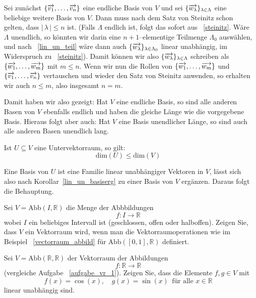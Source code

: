 \beweisvon{~\ref{vektorraum_basis_lange}} Sei zunächst 
$\{ \overrightarrow{v_1}, \ldots , \overrightarrow{v_n} \}$ eine endliche Basis von $V$ und sei 
$\{ \overrightarrow{w_{\lambda}} \}_{\lambda \in \Lambda}$ eine beliebige weitere Basis von  
$V$. Dann muss nach dem Satz von Steinitz schon gelten, dass $\vert \, \lambda \, \vert \leq n$ ist. (Falls 
$\Lambda$ endlich ist, folgt das sofort aus ~\ref{steinitz}. Wäre $\Lambda$ unendlich, so könnten wir darin 
eine $n+1$--elementige Teilmenge $\Lambda_0$ auswählen, und nach ~\ref{lin_un_teil} wäre dann auch 
$\{ \overrightarrow{w_{\lambda}} \}_{\lambda \in \Lambda_0}$ linear unabhängig, im Widerspruch zu 
~\ref{steinitz}). Damit können wir also $\{ \overrightarrow{w_{\lambda}} \}_{\lambda \in \Lambda}$ schreiben 
als $\{ \overrightarrow{w_1}, \ldots , \overrightarrow{w_m} \}$ mit $m \leq n$. Wenn wir nun die Rollen von
$\{ \overrightarrow{w_1}, \ldots , \overrightarrow{w_m} \}$ und 
$\{ \overrightarrow{v_1}, \ldots , \overrightarrow{v_n} \}$ vertauschen und wieder den Satz von Steinitz 
anwenden, so erhalten wir auch $n \leq m$, also insgesamt $n = m$.

Damit haben wir also gezeigt: Hat $V$ eine endliche Basis, so sind alle anderen Basen von $V$ ebenfalls endlich 
und haben die gleiche Länge wie die vorgegebene Basis. Hieraus folgt aber auch: Hat $V$ eine Basis unendlicher 
Länge, so sind auch alle anderen Basen unendlich lang.

\bigbreak

\begin{korollar} Ist $U \subseteq V$ eine Untervektorraum, so gilt:
  	$$ \textrm{dim}(U) \leq \textrm{dim}(V) $$
\end{korollar}

\beweis Eine Basis von $U$ ist eine Familie linear unabhängiger Vektoren in $V$, lässt sich also nach 
Korollar~\ref{lin_un_basiserg} zu einer Basis von $V$ ergänzen. Daraus folgt die Behauptung.

\bigbreak

\begin{aufgabe}\label{aufgabe_vr_1} Sei $V = \textrm{Abb}(I, \mathbb R)$ die Menge der Abbbildungen
  	$$ f: I \longrightarrow \mathbb R $$
wobei $I$ ein beliebiges Intervall ist (geschlossen, offen oder halboffen). Zeigen Sie, dass $V$ ein 
Vektorraum wird, wenn man die Vektorraumoperationen wie im Beispiel ~\ref{vectorraum_abbild} für 
$\textrm{Abb}([0,1], \mathbb R)$ definiert.
\end{aufgabe}

\begin{aufgabe}\label{aufgabe_vr_2}  Sei $V = \textrm{Abb}(\mathbb R, \mathbb R)$ der Vektorraum der Abbildungen
  	$$ f : \mathbb R \longrightarrow \mathbb R $$
(vergleiche Aufgabe ~\ref{aufgabe_vr_1}). Zeigen Sie, dass die Elemente $f, g \in V$ mit 
  	$$ f(x) = \cos(x), \quad g(x) = \sin(x) \, \textrm{ für alle } x \in \mathbb R $$
linear unabhängig sind.
\end{aufgabe} 

